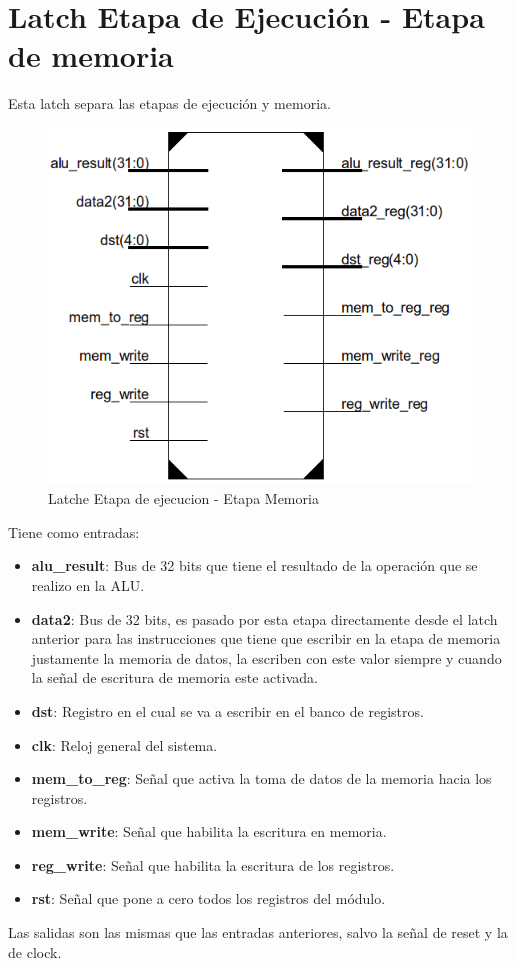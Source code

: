 \section{Latch Etapa de Ejecuci\'on - Etapa de memoria}

Esta latch separa las etapas de ejecuci\'on y memoria.
\begin{figure}[H]
\centering
\includegraphics[scale=0.35]{img/latch_ex_m}
\caption{Latche Etapa de ejecucion - Etapa Memoria}
\label{fig:latch_ex_mem}
\end{figure}
Tiene como entradas:
\begin{itemize}
  \item \textbf{alu\_result}: Bus de 32 bits que tiene el resultado de la operaci\'on que se realizo en la ALU.
  \item \textbf{data2}: Bus de 32 bits, es pasado por esta etapa directamente desde el latch anterior para las instrucciones que tiene que escribir en la etapa de memoria justamente la memoria de datos, la escriben con este valor siempre y cuando la señal de escritura de memoria este activada.
  \item \textbf{dst}: Registro en el cual se va a escribir en el banco de registros.
  \item \textbf{clk}: Reloj general del sistema.
  \item \textbf{mem\_to\_reg}: Señal que activa la toma de datos de la memoria hacia los registros.
  \item \textbf{mem\_write}: Señal que habilita la escritura en memoria.
  \item \textbf{reg\_write}: Señal que habilita la escritura de los registros.
  \item \textbf{rst}: Señal que pone a cero todos los registros del m\'odulo.
\end{itemize}

Las salidas son las mismas que las entradas anteriores, salvo la señal de reset y la de clock.